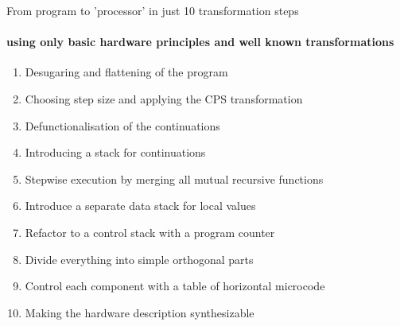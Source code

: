\documentclass[pdf]{beamer}
\begin{document}
\begin{frame}{From program to 'processor' in just 10 transformation steps}
\framesubtitle{using only basic hardware principles and well known transformations}
\begin{block}{}
\begin{enumerate}
 \item Desugaring and flattening of the program
 \item Choosing step size and applying the CPS transformation
 \item Defunctionalisation of the continuations
 \item Introducing a stack for continuations
 \item Stepwise execution by merging all mutual recursive functions
 \item Introduce a separate data stack for local values
 \item Refactor to a control stack with a program counter
 \item Divide everything into simple orthogonal parts

 \item Control each component with a table of horizontal microcode
 \item Making the hardware description synthesizable
\end{enumerate}
\end{block}


\end{frame}
\end{document}
